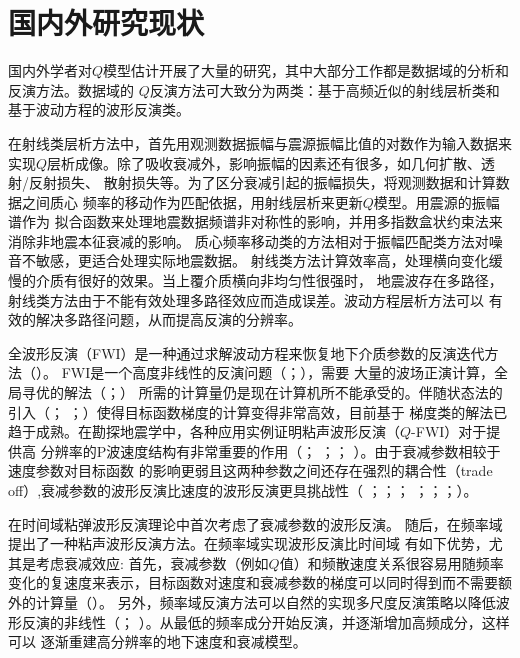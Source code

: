 \vspace{1.0cm}
\section{国内外研究现状}

国内外学者对$Q$模型估计开展了大量的研究，其中大部分工作都是数据域的分析和反演方法。数据域的
$Q$反演方法可大致分为两类：基于高频近似的射线层析类和基于波动方程的波形反演类。

在射线类层析方法中，首先用观测数据振幅与震源振幅比值的对数作为输入数据来
实现$Q$层析成像。除了吸收衰减外，影响振幅的因素还有很多，如几何扩散、透射/反射损失、
散射损失等。为了区分衰减引起的振幅损失，将观测数据和计算数据之间质心
频率的移动作为匹配依据，用射线层析来更新$Q$模型。用震源的振幅谱作为
拟合函数来处理地震数据频谱非对称性的影响，并用多指数盒状约束法来消除非地震本征衰减的影响。
质心频率移动类的方法相对于振幅匹配类方法对噪音不敏感，更适合处理实际地震数据。
射线类方法计算效率高，处理横向变化缓慢的介质有很好的效果。当上覆介质横向非均匀性很强时，
地震波存在多路径，射线类方法由于不能有效处理多路径效应而造成误差。波动方程层析方法可以
有效的解决多路径问题，从而提高反演的分辨率。

全波形反演（FWI）是一种通过求解波动方程来恢复地下介质参数的反演迭代方法（）。
FWI是一个高度非线性的反演问题（；），需要
大量的波场正演计算，全局寻优的解法（；）
所需的计算量仍是现在计算机所不能承受的。伴随状态法的引入（；
；）使得目标函数梯度的计算变得非常高效，目前基于
梯度类的解法已趋于成熟。在勘探地震学中，各种应用实例证明粘声波形反演（$Q$-FWI）对于提供高
分辨率的P波速度结构有非常重要的作用（； 
；； ）。由于衰减参数相较于速度参数对目标函数
的影响更弱且这两种参数之间还存在强烈的耦合性（trade off）,衰减参数的波形反演比速度的波形反演更具挑战性（
；；； 
；；；）。

在时间域粘弹波形反演理论中首次考虑了衰减参数的波形反演。
随后，在频率域提出了一种粘声波形反演方法。在频率域实现波形反演比时间域
有如下优势，尤其是考虑衰减效应: 首先，衰减参数（例如$Q$值）和频散速度关系很容易用随频率
变化的复速度来表示，目标函数对速度和衰减参数的梯度可以同时得到而不需要额外的计算量（）。
另外，频率域反演方法可以自然的实现多尺度反演策略以降低波形反演的非线性（；
）。从最低的频率成分开始反演，并逐渐增加高频成分，这样可以
逐渐重建高分辨率的地下速度和衰减模型。

